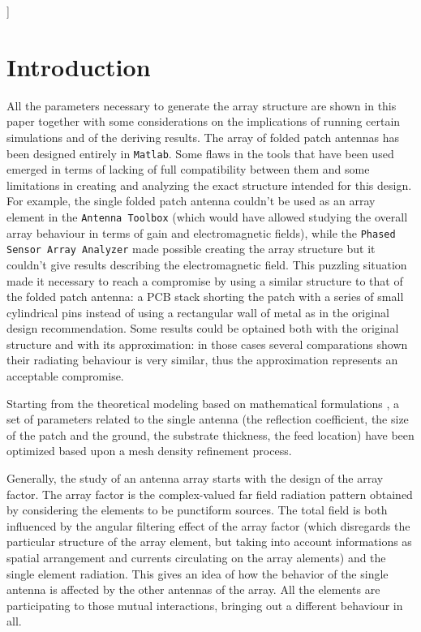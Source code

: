 \documentclass[10 pt,a4paper,twocolumn]{article}
\begin{document}
{{\begin{@twocolumnfalse}
\begin{abstract}
	\end{abstract}
	\vspace*{20 pt}
\end{@twocolumnfalse}
}
]




\section*{Introduction}
All the parameters necessary to generate the array structure are shown in this paper together with some considerations on the implications of running certain simulations and of the deriving results. The array of folded patch antennas has been designed entirely in \texttt{Matlab}. Some flaws in the tools that have been used emerged in terms of lacking of full compatibility between them and some limitations in creating and analyzing the exact structure intended for this design. For example, the single folded patch antenna couldn't be used as an array element in the \texttt{Antenna Toolbox} (which would have allowed studying the overall array behaviour in terms of gain and electromagnetic fields), while the \texttt{Phased Sensor Array Analyzer} made possible creating the array structure but it couldn't give results describing the electromagnetic field. This puzzling situation made it necessary to reach a compromise by using a similar structure to that of the folded patch antenna: a PCB stack shorting the patch with a series of small cylindrical pins instead of using a rectangular wall of metal as in the original design recommendation. Some results could be optained both with the original structure and with its approximation: in those cases several comparations shown their radiating behaviour is very similar, thus the approximation represents an acceptable compromise. 

Starting from the theoretical modeling based on mathematical formulations \textbf{\cite{Balanis1}}, a set of parameters related to the single antenna (the reflection coefficient, the size of the patch and the ground, the substrate thickness, the feed location) have been optimized based upon a mesh density refinement process. 

Generally, the study of an antenna array starts with the design of the array factor. The array factor is the complex-valued far field radiation pattern obtained by considering the elements to be punctiform sources. The total field is both influenced by the angular filtering effect of the array factor (which disregards the particular structure of the array element, but taking into account informations as spatial arrangement and currents circulating on the array alements) and the single element radiation. This gives an idea of how the behavior of the single antenna is affected by the other antennas of the array. All the elements are participating to those mutual interactions, bringing out a different behaviour in all. 

}
\end{document}
